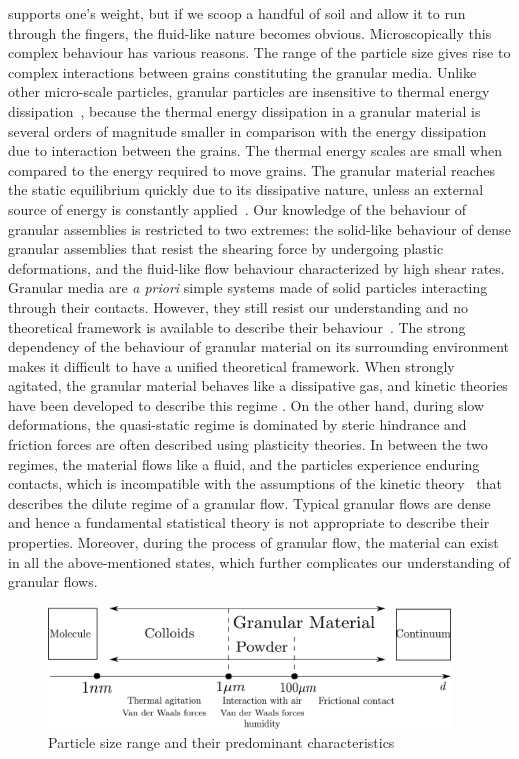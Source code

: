 supports one's weight, but if we scoop a handful of soil and allow it to run 
through the fingers, the fluid-like nature becomes obvious. Microscopically 
this complex behaviour has various reasons. The range of the particle size 
gives rise to complex interactions between grains constituting the granular 
media. Unlike other micro-scale particles, granular particles are insensitive 
to thermal energy dissipation~\citep{Mehta2011}, because the thermal energy 
dissipation in a granular material is several orders of magnitude smaller in 
comparison with the energy dissipation due to interaction between the grains. 
The thermal energy scales are small when compared to the energy required to 
move grains. The granular material reaches the static equilibrium quickly due 
to its dissipative nature, unless an external source of energy is constantly 
applied~\citep{Choi2005}. Our knowledge of the behaviour of granular assemblies 
is restricted to two extremes: the solid-like behaviour of dense granular 
assemblies that resist the shearing force by undergoing plastic deformations, 
and the fluid-like flow behaviour characterized by high shear rates. Granular 
media are \textit{a priori} simple systems made of solid particles interacting 
through their contacts. However, they still resist our understanding and no 
theoretical framework is available to describe their 
behaviour~\citep{Pouliquen2006}. The strong dependency of the behaviour of 
granular material on its surrounding environment makes it difficult to have a 
unified theoretical framework. When strongly agitated, the granular material 
behaves like a dissipative gas, and kinetic theories have been developed to 
describe this regime \citep{Xu2003,Popken1999}. On the other hand, during slow 
deformations, the quasi-static regime is dominated by steric hindrance and 
friction forces are often described using plasticity theories. In between the 
two regimes, the material flows like a fluid, and the particles experience 
enduring contacts, which is incompatible with the assumptions of the kinetic 
theory~\citep{Pouliquen2006} that describes the dilute regime of a granular 
flow. Typical granular flows are dense and hence a fundamental statistical 
theory is not appropriate to describe their properties. Moreover, during the 
process of granular flow, the material can exist in all the above-mentioned 
states, which further complicates our understanding of granular flows.

\begin{figure}[htbp]
\centering
\includegraphics[width=0.95\textwidth]{Granular}
\caption{Particle size range and their predominant characteristics}
\label{fig:granular}
\end{figure}

